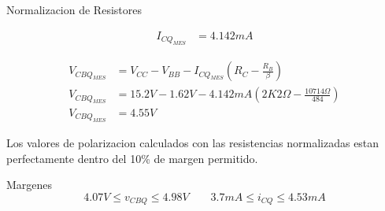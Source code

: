 \begin{frame}[allowframebreaks]{Normalizacion de Resistores}
\begin{figure}[!ht]
\begin{minipage}{0.45\textwidth}
\begin{align*}
        I_{CQ_{MES}} &= 4.142mA
      \end{align*}
    \end{minipage}
    \hfill
    \begin{minipage}{0.45\textwidth}
      \begin{align*}
        V_{CBQ_{MES}} &= V_{CC} - V_{BB} - I_{CQ_{MES}} \left(R_C - \frac{R_B}{\beta}\right)\\[6pt]
        V_{CBQ_{MES}} &= 15.2V - 1.62V - 4.142mA \left(2K2\Omega - \frac{10714\Omega}{484}\right)\\[6pt]
        V_{CBQ_{MES}} &= 4.55V
      \end{align*}
    \end{minipage}
  \end{figure}

  Los valores de polarizacion calculados con las resistencias normalizadas estan perfectamente dentro del 10\% de margen
  permitido.
  \begin{block}{Margenes}
    \begin{equation*}
      4.07V \leq v_{CBQ} \leq 4.98V \quad \quad 3.7mA \leq i_{CQ} \leq 4.53mA
    \end{equation*}
  \end{block}


\end{frame}
